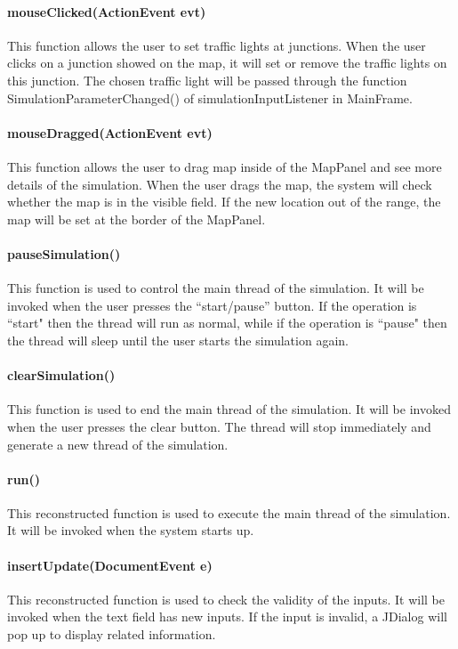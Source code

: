 \documentclass[a4paper,12pt]{article}
\begin{document}
\paragraph{mouseClicked(ActionEvent evt)} This function allows the user to set traffic lights at junctions. When the user clicks on a junction showed on the map, it will set or remove the traffic lights on this junction. The chosen traffic light will be passed through the function SimulationParameterChanged() of simulationInputListener in MainFrame.
\paragraph{mouseDragged(ActionEvent evt)} This function allows the user to drag map inside of the MapPanel and see more details of the simulation. When the user drags the map, the system will check whether the map is in the visible field. If the new location out of the range, the map will be set at the border of the MapPanel.

\paragraph{pauseSimulation()} This function is used to control the main thread of the simulation. It will be invoked when the user presses the ``start/pause'' button. If the operation is  ``start" then the thread will run as normal, while if the operation is ``pause" then the thread will sleep until the user starts the simulation again.
\paragraph{clearSimulation()} This function is used to end the main thread of the simulation. It will be invoked when the user presses the clear button. The thread will stop immediately and generate a new thread of the simulation.
\paragraph{run()}This reconstructed function is used to execute the main thread of the simulation. It will be invoked when the system starts up.

\paragraph{insertUpdate(DocumentEvent e)} This reconstructed function is used to check the validity of the inputs. It will be invoked when the text field has new inputs.  If the input is invalid, a JDialog will pop up to display related information.
\end{document}

